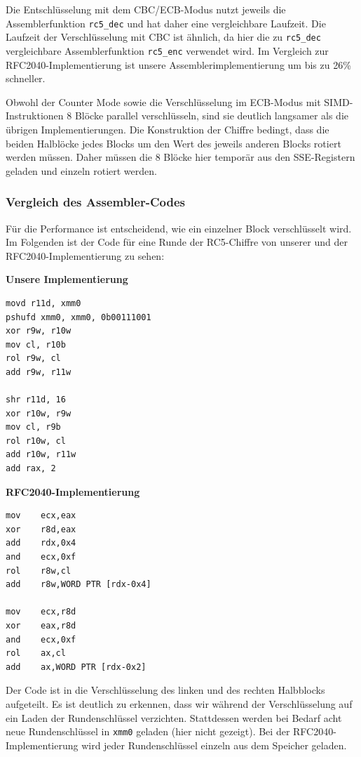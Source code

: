 \documentclass[course=erap]{aspdoc}
\begin{document}
Die Entschlüsselung mit dem CBC/ECB-Modus nutzt jeweils die Assemblerfunktion \texttt{rc5\_dec} und hat daher eine vergleichbare Laufzeit. Die Laufzeit der Verschlüsselung mit CBC ist ähnlich, da hier die zu \texttt{rc5\_dec} vergleichbare Assemblerfunktion \texttt{rc5\_enc} verwendet wird. Im Vergleich zur RFC2040-Implementierung
ist unsere Assemblerimplementierung um bis zu 26\% schneller.\bigbreak

Obwohl der Counter Mode sowie die Verschlüsselung im ECB-Modus mit SIMD-Instruktionen 8 Blöcke parallel verschlüsseln, sind sie deutlich langsamer als die übrigen Implementierungen. Die Konstruktion der Chiffre bedingt, dass die beiden Halblöcke jedes Blocks um den Wert des jeweils anderen Blocks rotiert werden müssen. Daher müssen die 8 Blöcke hier temporär aus den SSE-Registern geladen und einzeln rotiert werden.

\subsubsection{Vergleich des Assembler-Codes}

Für die Performance ist entscheidend, wie ein einzelner Block verschlüsselt wird. Im Folgenden ist der Code für eine Runde der RC5-Chiffre von unserer und der RFC2040-Implementierung zu sehen:

\begin{multicols}{2}

\noindent \textbf{Unsere Implementierung}

\begin{verbatim}
movd r11d, xmm0
pshufd xmm0, xmm0, 0b00111001
xor r9w, r10w
mov cl, r10b
rol r9w, cl
add r9w, r11w

shr r11d, 16
xor r10w, r9w
mov cl, r9b
rol r10w, cl
add r10w, r11w
add rax, 2
\end{verbatim}

\noindent \textbf{RFC2040-Implementierung}

\begin{verbatim}
mov    ecx,eax
xor    r8d,eax
add    rdx,0x4
and    ecx,0xf
rol    r8w,cl
add    r8w,WORD PTR [rdx-0x4]

mov    ecx,r8d
xor    eax,r8d
and    ecx,0xf
rol    ax,cl
add    ax,WORD PTR [rdx-0x2]

\end{verbatim}

\end{multicols}

\noindent Der Code ist in die Verschlüsselung des linken und des rechten Halbblocks aufgeteilt. Es ist deutlich zu erkennen, dass wir während der Verschlüsselung auf ein Laden der Rundenschlüssel verzichten. Stattdessen werden bei Bedarf acht neue Rundenschlüssel in \texttt{xmm0} geladen (hier nicht gezeigt). Bei der RFC2040-Implementierung wird jeder Rundenschlüssel einzeln aus dem Speicher geladen.
\end{document}
